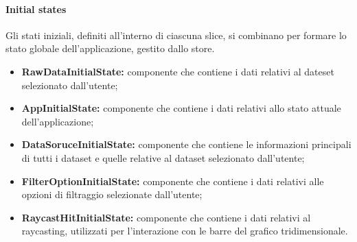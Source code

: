 \paragraph{Initial states}
    Gli stati iniziali, definiti all'interno di ciascuna slice, si combinano per formare lo stato globale dell'applicazione, gestito dallo store.
    \begin{itemize}
        \item \textbf{RawDataInitialState:} componente che contiene i dati relativi al dateset selezionato dall'utente;
        \item \textbf{AppInitialState:} componente che contiene i dati relativi allo stato attuale dell'applicazione;
        \item \textbf{DataSoruceInitialState:} componente che contiene le informazioni principali di tutti i dataset e quelle relative al dataset selezionato dall'utente;
        \item \textbf{FilterOptionInitialState:} componente che contiene i dati relativi alle opzioni di filtraggio selezionate dall'utente;
        \item \textbf{RaycastHitInitialState:} componente che contiene i dati relativi al raycasting, utilizzati per l'interazione con le barre del grafico tridimensionale.
    \end{itemize}
